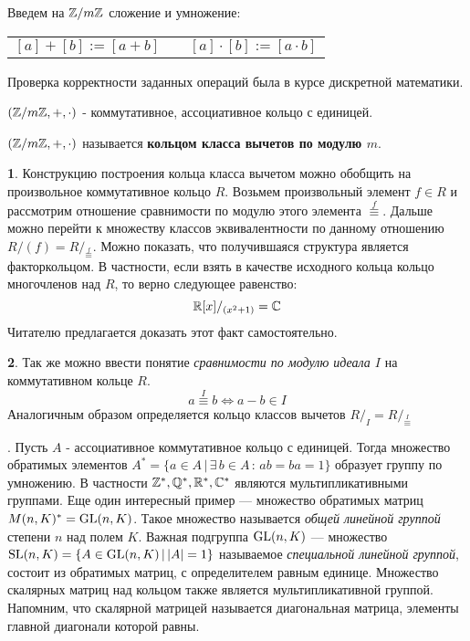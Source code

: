 \documentclass[../main.tex]{subfiles}
\begin{document}
Введем на $\mathbb{Z}/m\mathbb{Z}$ сложение и умножение:

\begin{center}
\begin{tabular}{l p{2.5cm} r}
    $[a] + [b ] := [a + b]$ &  & $[a] \cdot [b] := [a \cdot b]$
\end{tabular}
\end{center}

Проверка корректности заданных операций была в курсе дискретной математики.
\begin{theorem-non}
    $(\mathbb{Z}/m\mathbb{Z}, +, \cdot)$ - коммутативное, ассоциативное кольцо с единицей.
\end{theorem-non}
\begin{definition}
    $(\mathbb{Z}/m\mathbb{Z}, +, \cdot)$ называется \textbf{кольцом класса вычетов по модулю $m$}.
\end{definition}


\textbf{1}. Конструкцию построения кольца класса вычетом можно обобщить на произвольное коммутативное кольцо $R$. Возьмем произвольный элемент $f \in R$ и рассмотрим отношение сравнимости по модулю этого элемента {\scriptsize${\overset{f}{\equiv}}$}. Дальше можно перейти к множеству классов эквивалентности по данному отношению $R/(f) = R/_{\overset{f}{\equiv}}$. Можно показать, что получившаяся структура является факторкольцом. В частности, если взять в качестве исходного кольца кольцо многочленов над $R$, то верно следующее равенство:
\begin{equation*}
    \mathbb{R}[x]/_{(x^2 + 1)} = \mathbb{C}
\end{equation*}
Читателю предлагается доказать этот факт самостоятельно.
\pagebreak

\textbf{2}. Так же можно ввести понятие \textit{сравнимости по модулю идеала $I$} на коммутативном кольце $R$.
\begin{equation*}
    a \overset{I}{\equiv} b \iff a - b \in I
\end{equation*}
Аналогичным образом определяется кольцо классов вычетов $R/_I = R/_{{\overset{I}{\equiv}}}$

\textbf{}. Пусть $A$ - ассоциативное коммутативное кольцо с единицей. Тогда множество
обратимых элементов \linebreak $A^{*} = \{a \in A \, | \, \exists \, b \in A \, : \, ab = ba =
1\}$ образует группу по умножению. В частности $\mathbb{Z}^{*}, \mathbb{Q}^{*}, \mathbb{R}^{*}, \mathbb{C}^{*}$ являются
мультипликативными группами. Еще один интересный пример --- множество обратимых матриц $M(n, K)^{*
} = \operatorname{GL}(n, K)$. Такое множество называется \textit{общей линейной группой} степени $n$ над полем
$K$. Важная подгруппа $\operatorname{GL}(n, K)$ --- множество $\operatorname{SL}(n, K) = \{A \in \operatorname{GL}(n, K) \, | \, |A| = 1\}$
называемое \textit{специальной линейной группой}, состоит из обратимых матриц, с определителем
равным единице. Множество скалярных матриц над кольцом также является мультипликативной группой.
Напомним, что скалярной матрицей называется диагональная матрица, элементы главной диагонали
которой равны.
\end{document}
